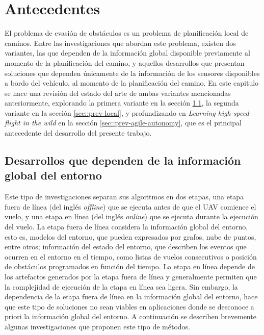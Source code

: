 \chapter{Antecedentes}
\label{capitulo4}


El problema de evasión de obstáculos es un problema de planificación local de caminos. Entre las investigaciones que abordan este problema, existen dos variantes, las que dependen de la información global disponible previamente al momento de la planificación del camino, y aquellos desarrollos que presentan soluciones que dependen únicamente de la información de los sensores disponibles a bordo del vehículo, al momento de la planificación del camino. En este capitulo se hace una revisión del estado del arte de ambas variantes mencionadas anteriormente, explorando la primera variante en la sección \ref{sec::prev-global}, la segunda variante en la sección \ref{sec::prev-local}, y profundizando en \textit{Learning high-speed flight in the wild} en la sección \ref{sec::prev-agile-autonomy}, que es el principal antecedente del desarrollo del presente trabajo.

\section{Desarrollos que dependen de la información global del entorno}
\label{sec::prev-global}

Este tipo de investigaciones separan sus algoritmos en dos etapas, una etapa fuera de línea (del inglés \textit{offline}) que se ejecuta antes de que el UAV comience el vuelo, y una etapa en línea (del inglés \textit{online}) que se ejecuta durante la ejecución del vuelo. La etapa fuera de línea considera la información global del entorno, esto es, modelos del entorno, que pueden expresados por grafos, nube de puntos, entre otros; información del estado del entorno, que describen los eventos que ocurren en el entorno en el tiempo, como listas de vuelos consecutivos o posición de obstáculos programados en función del tiempo. La etapa en línea depende de los artefactos generados por la etapa fuera de línea y generalmente permiten que la complejidad de ejecución de la etapa en línea sea ligera. Sin embargo, la dependencia de la etapa fuera de línea en la información global del entorno, hace que este tipo de soluciones no sean viables en aplicaciones donde se desconoce a priori la información global del entorno. A continuación se describen brevemente algunas investigaciones que proponen este tipo de métodos.

